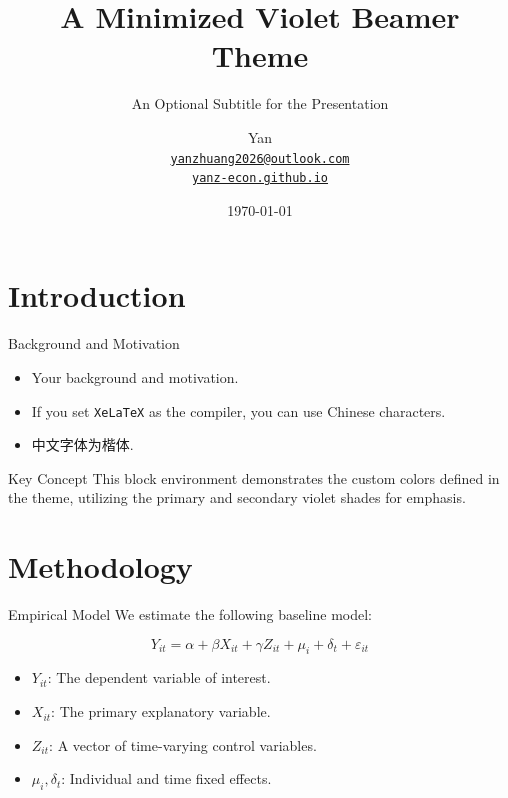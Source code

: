 \documentclass[10pt, aspectratio=169]{beamer}
\title[Short Title]{A Minimized Violet Beamer Theme}
\subtitle{An Optional Subtitle for the Presentation}
\author[Yan]{
    Yan \\ 
    \vspace{0.2cm}
    \footnotesize
    \href{mailto:yanzhuang2026@outlook.com}{\texttt{yanzhuang2026@outlook.com}} \\
    \href{https://yanz-econ.github.io/}{\texttt{yanz-econ.github.io}}
}
\institute{Your Institute}
\date{\today}
\begin{document}
\begin{frame}
    \titlepage
\end{frame}

\section{Introduction}
\begin{frame}{Background and Motivation}
    \begin{itemize}
        \item Your background and motivation.
        \item If you set \texttt{XeLaTeX} as the compiler, you can use Chinese characters.
        \item 中文字体为楷体.
    \end{itemize}
    
    \vspace{1em}
    \begin{block}{Key Concept}
        This block environment demonstrates the custom colors defined in the theme, utilizing the primary and secondary violet shades for emphasis.
    \end{block}
\end{frame}

\section{Methodology}
\begin{frame}{Empirical Model}
    We estimate the following baseline model:
    
    \vspace{1em}
    $$
    Y_{it} = \alpha + \beta X_{it} + \gamma Z_{it} + \mu_i + \delta_t + \varepsilon_{it}
    $$
    \vspace{1em}
    
    \begin{itemize}
        \item $Y_{it}$: The dependent variable of interest.
        \item $X_{it}$: The primary explanatory variable.
        \item $Z_{it}$: A vector of time-varying control variables.
        \item $\mu_i, \delta_t$: Individual and time fixed effects.
    \end{itemize}
\end{frame}
\end{document}

